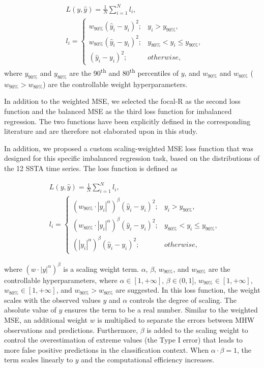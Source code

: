 \documentclass[11pt, a4paper]{article}
\begin{document}
\begin{align}
&L(y,\hat{y})=\frac{1}{N}\sum_{i=1}^N l_i,\\
&l_i=\begin{cases}
w_{90\%}(\hat{y}_i-y_i)^2;
& y_i>y_{90\%},\\
w_{80\%}(\hat{y}_i-y_i)^2;
& y_{80\%}<y_i\leq y_{90\%},\\
(\hat{y}_i-y_i)^2;
& otherwise,
\end{cases}
\end{align}
where $y_{90\%}$ and $y_{80\%}$ are the 90\textsuperscript{th} and 80\textsuperscript{th} percentiles of $y$, and $w_{90\%}$ and $w_{80\%}$ ($w_{90\%}>w_{80\%}$) are the controllable weight hyperparameters.

In addition to the weighted MSE, we selected the focal-R \citep{yang2021delving} as the second loss function and the balanced MSE \citep{ren2022balanced} as the third loss function for imbalanced regression. The two functions have been explicitly defined in the corresponding literature and are therefore not elaborated upon in this study.

In addition, we proposed a custom scaling-weighted MSE loss function that was designed for this specific imbalanced regression task, based on the distributions of the 12 SSTA time series. The loss function is defined as

\begin{align}
&L(y,\hat{y})=\frac{1}{N}\sum_{i=1}^N l_i,\\
&l_i=\begin{cases}
(w_{90\%}\cdot |y_i|^{\alpha})^{\beta}(\hat{y}_i-y_i)^2;
& y_i>y_{90\%},\\
(w_{80\%}\cdot |y_i|^{\alpha})^{\beta}(\hat{y}_i-y_i)^2;
& y_{80\%}<y_i\leq y_{90\%},\\
(|y_i|^{\alpha})^{\beta}(\hat{y}_i-y_i)^2;
& otherwise,
\end{cases}
\end{align}

where $(w\cdot |y|^{\alpha})^{\beta}$ is a scaling weight term. $\alpha$, $\beta$, $w_{90\%}$, and $w_{80\%}$ are the controllable hyperparameters, where $\alpha\in[1,+\infty]$, $\beta\in(0,1]$, $w_{90\%}\in[1,+\infty]$, $w_{80\%}\in[1,+\infty]$, and $w_{90\%}>w_{80\%}$ are suggested. In this loss function, the weight scales with the observed values $y$ and $\alpha$ controls the degree of scaling. The absolute value of $y$ ensures the term to be a real number. Similar to the weighted MSE, an additional weight $w$ is multiplied to separate the errors between MHW observations and predictions. Furthermore, $\beta$ is added to the scaling weight to control the overestimation of extreme values (the Type I error) that leads to more false positive predictions in the classification context. When $\alpha\cdot\beta=1$, the term scales linearly to $y$ and the computational efficiency increases.
\end{document}
